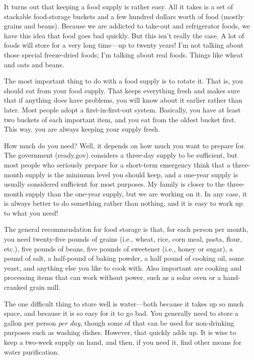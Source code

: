 It turns out that keeping a food supply is rather easy. All it takes is
a set of stackable food-storage buckets and a few hundred dollars worth
of food (mostly grains and beans). Because we are addicted to take-out
and refrigerator foods, we have this idea that food goes bad quickly.
But this isn’t really the case. A lot of foods will store for a very
long time—up to twenty years!  I’m not talking about those special
freeze-dried foods; I’m talking about real foods. Things like wheat and
oats and beans.

The most important thing to do with a food supply is to rotate it. That
is, you should eat from your food supply. That keeps everything fresh
and makes sure that if anything does have problems, you will know about
it earlier rather than later. Most people adopt a first-in-first-out
system. Basically, you have at least two buckets of each important
item, and you eat from the oldest bucket first. This way, you are
always keeping your supply fresh.

How much do you need?  Well, it depends on how much you want to prepare
for. The government (ready.gov) considers a three-day supply to be
sufficient, but most people who seriously prepare for a short-term
emergency think that a three-month supply is the minimum level you
should keep, and a one-year supply is usually considered sufficient for
most purposes. My family is closer to the three-month supply than the
one-year supply, but we are working on it. In any case, it is always
better to do something rather than nothing, and it is easy to work up
to what you need!  

The general recommendation for food storage is that, for each person
per month, you need
twenty-five pounds of grains (i.e., wheat, rice, corn meal, pasta,
flour, etc.), five pounds of beans, five pounds of sweetener (i.e.,
honey or sugar), a pound of salt, a half-pound of baking powder, a half
pound of cooking oil, some yeast, and anything else you like to cook
with. Also important are cooking and processing items that can work
without power, such as a solar oven or a hand-cranked grain mill.

The one difficult thing to store well is water—both because it takes up
so much space, and because it is so easy for it to go bad. You
generally need to store a gallon per person \textit{per day}, though
some of that can be used for non-drinking purposes such as washing
dishes. However, that quickly adds up. It is wise to keep a two-week
supply on hand, and then, if you need it, find other means for water
purification. 

